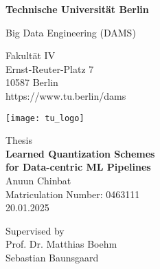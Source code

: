 \thispagestyle{empty}
\begin{center}

\vspace*{1.4cm}
{\LARGE \textbf{Technische Universität Berlin}}

\vspace{0.5cm}

{\large Big Data Engineering (DAMS)\\[1mm]}

Fakultät IV\\
Ernst-Reuter-Platz 7\\
10587 Berlin\\
https://www.tu.berlin/dams\\

\vspace*{1cm}

\texttt{[image: tu\_logo]}

\vspace*{1.0cm}

{\LARGE {} Thesis}\\ %

\vspace{1.0cm}
{\LARGE \textbf{Learned Quantization Schemes}}\\
\vspace*{0.3cm}
{\LARGE \textbf{for Data-centric ML Pipelines}}\\
\vspace*{1.0cm}
{\LARGE Anuun Chinbat}
\\
\vspace*{0.5cm}
Matriculation Number: 0463111\\
20.01.2025\\ %
\vspace*{1.0cm}

Supervised by\\
Prof. Dr. Matthias Boehm \\
Sebastian Baunsgaard



\end{center}

